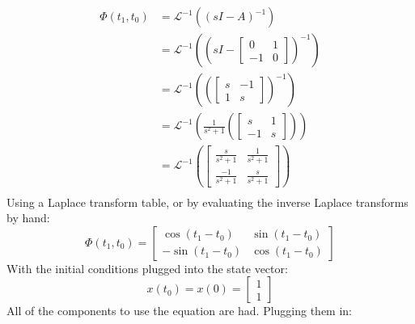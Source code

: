\begin{example}
\begin{equation*}
    \begin{split}
      \Phi(t_{1},t_{0})&=\mathscr{L}^{-1}((sI-A)^{-1}) \\
      &=\mathscr{L}^{-1}
      \left(
        \left(sI-
          \begin{bmatrix}
            0 & 1 \\ -1 & 0
          \end{bmatrix}
        \right)^{-1}
      \right) \\
      &=\mathscr{L}^{-1}
      \left(
        \left(
          \begin{bmatrix}
          s & -1 \\ 1 & s
          \end{bmatrix}
        \right)^{-1}
      \right) \\
      &=\mathscr{L}^{-1}
      \left(
        \frac{1}{s^{2}+1}
        \left(
          \begin{bmatrix}
            s & 1 \\ -1 & s
          \end{bmatrix}
        \right)
      \right) \\
      &=\mathscr{L}^{-1}
      \left(
        \begin{bmatrix}
          \frac{s}{s^{2}+1} & \frac{1}{s^{2}+1} \\ \frac{-1}{s^{2}+1} & \frac{s}{s^{2}+1}
        \end{bmatrix}
      \right) \\
    \end{split}
  \end{equation*}
  Using a Laplace transform table, or by evaluating the inverse Laplace transforms by hand:
  \begin{equation*}
    \Phi(t_{1},t_{0})=
    \begin{bmatrix}
      \cos(t_{1}-t_{0}) & \sin(t_{1}-t_{0}) \\ -\sin(t_{1}-t_{0}) & \cos(t_{1}-t_{0})
    \end{bmatrix}
  \end{equation*}
  With the initial conditions plugged into the state vector:
  \begin{equation*}
    x(t_{0})=x(0)=\begin{bmatrix} 1 \\ 1 \end{bmatrix}
  \end{equation*}
  All of the components to use the equation are had.
  Plugging them in:
  \begin{equation*}
    \begin{split}

\end{split}
\end{equation*}
\end{example}
